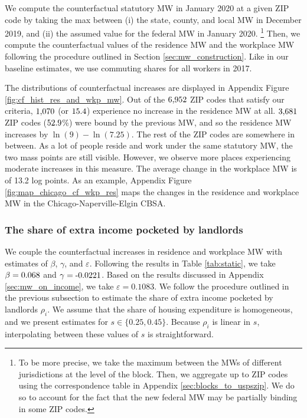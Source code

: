 We compute the counterfactual statutory MW in January 2020 at a given ZIP code 
by taking the max between (i) the state, county, and local MW in December 2019, 
and (ii) the assumed value for the federal MW in January 2020.%
\footnote{To be more precise, we take the maximum between the MWs of different
jurisdictions at the level of the block.
Then, we aggregate up to ZIP codes using the correspondence table in Appendix 
\ref{sec:blocks_to_uspszip}.
We do so to account for the fact that the new federal MW may be partially binding
in some ZIP codes.}
Then, we compute the counterfactual values of the residence MW and the workplace
MW following the procedure outlined in Section \ref{sec:mw_construction}.
Like in our baseline estimates, we use commuting shares for all workers in
2017.

The distributions of counterfactual increases are displayed in Appendix
Figure \ref{fig:cf_hist_res_and_wkp_mw}.
Out of the $\textnormal{6,952}$ ZIP codes that satisfy our criteria, $\textnormal{1,070}$ (or $\textnormal{15.4}$) 
experience no increase in the residence MW at all.
$\textnormal{3,681}$ ZIP codes ($\textnormal{52.9}$\%) were bound by the previous MW, and so the residence MW
increases by $\ln(9)-\ln(7.25)$.
The rest of the ZIP codes are somewhere in between.
As a lot of people reside and work under the same statutory MW, the two mass
points are still visible.
However, we observe more places experiencing moderate increases in this measure.
The average change in the workplace MW is of 13.2 log points.
As an example, Appendix Figure \ref{fig:map_chicago_cf_wkp_res} maps the changes 
in the residence and workplace MW in the Chicago-Naperville-Elgin CBSA.

\subsubsection*{The share of extra income pocketed by landlords}
\label{sec:cf_rents_and_wage_changes}

We couple the counterfactual increases in residence and workplace MW with 
estimates of $\beta$, $\gamma$, and $\varepsilon$.
Following the results in Table \ref{tab:static}, we take 
$\beta = \textnormal{0.068}$ and 
$\gamma = \textnormal{-0.0221}$.
Based on the results discussed in Appendix \ref{sec:mw_on_income}, we take
$\varepsilon = 0.1083$.
We follow the procedure outlined in the previous subsection to estimate the 
share of extra income pocketed by landlords $\rho_i$.
We assume that the share of housing expenditure is homogeneous, and 
we present estimates for $s\in\{0.25, 0.45\}$.
Because $\rho_i$ is linear in $s$, interpolating between these values of 
$s$ is straightforward.

